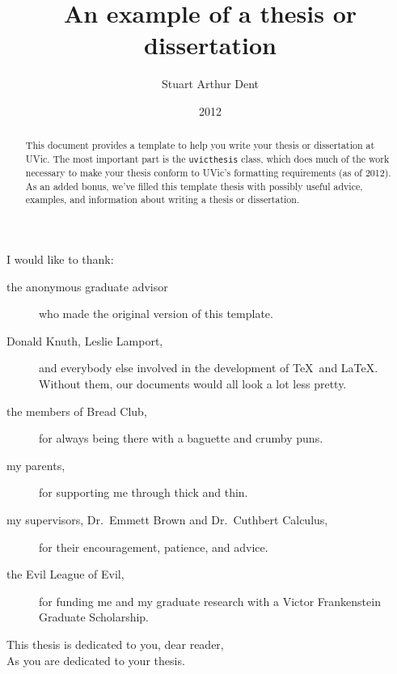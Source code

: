 \documentclass[12pt,oneside]{uvicthesis}
\title{An example of a thesis or dissertation}
\author{Stuart Arthur Dent}
\date{2012}
\begin{document}
\frontmatter
\maketitle
\makecommittee

\begin{abstract}
	This document provides a template to help you write your thesis or dissertation at UVic. The most important part is the \texttt{uvicthesis} class, which does much of the work necessary to make your thesis conform to UVic's formatting requirements (as of 2012). As an added bonus, we've filled this template thesis with possibly useful advice, examples, and information about writing a thesis or dissertation.
\end{abstract}

\newpage{}\tableofcontents
\newpage{}\listoftables
\newpage{}\listoffigures

\begin{acknowledgements}
	\noindent I would like to thank:
	\begin{description}
	\item[the anonymous graduate advisor] who made the original version of this template.
	\item[Donald Knuth, Leslie Lamport,] and everybody else involved in the development of \TeX\ and \LaTeX. Without them, our documents would all look a lot less pretty.
	\item[the members of Bread Club,] for always being there with a baguette and crumby puns.
	\item[my parents,] for supporting me through thick and thin.
	\item[my supervisors, Dr.\ Emmett Brown and Dr.\ Cuthbert Calculus,]
		for their encouragement, patience, and advice.
	\item[the Evil League of Evil,]
		for funding me and my graduate research with a Victor Frankenstein Graduate Scholarship.
	\end{description}
\end{acknowledgements}

\begin{dedication}
	\noindent This thesis is dedicated to you, dear reader,\\
	As you are dedicated to your thesis.
\end{dedication}
\mainmatter
\end{document}
